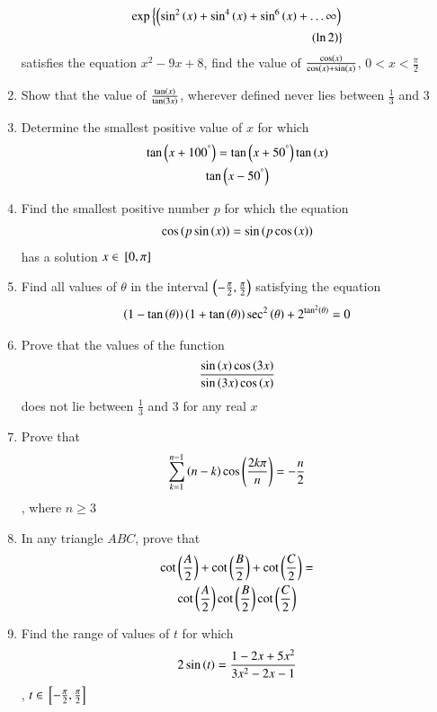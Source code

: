 \documentclass[journal,12pt,article,twocolumn]{IEEEtran}
\theoremstyle{remark}
\begin{document}
\begin{enumerate}
\begin{align*}
	\exp \left\{\left(\sin^2\left(x\right)+\sin^4\left(x\right)+\sin^6\left(x\right)+\dots\infty\right)\right.\\
	\left. \left(\ln 2\right)\right\}
\end{align*}
satisfies the equation $x^2-9x+8$, find the value of $\frac{\cos \left(x\right)}{\cos \left(x\right) + \sin \left(x\right)}$, $0<x<\frac{\pi}{2}$
\hfill{}
\item Show that the value of  $\frac{\tan \left(x\right)}{\tan \left(3x\right)}$, wherever defined never lies between $\frac{1}{3}$ and 3
\hfill{}
\item Determine the smallest positive value of $x$  for which 
\begin{multline*}
\tan {\ensuremath{\left(x+100^{\degree}\right)}}=\tan {\ensuremath{\left(x+50^{\degree}\right)}}\tan \left(x\right)\\\tan {\ensuremath{\left(x-50^{\degree}\right)}}
\end{multline*}
\hfill{}
\item Find the smallest positive number $p$ for which the equation 
\begin{align*}
\cos {\ensuremath{\left(p\sin \left(x\right)\right)}}=\sin {\ensuremath{\left(p\cos \left(x\right)\right)}}
\end{align*}
has a solution $ x \in {}\left[0, \pi\right]$
\hfill{}
\item Find all values of $\theta$ in the interval $\left(-\frac{\pi}{2},\frac{\pi}{2}\right)$ satisfying the equation 
\begin{align*}
\left(1-\tan \left(\theta\right)\right)\left(1+\tan \left(\theta\right)\right)\sec^2\left(\theta\right)+ 2^{\tan^2\left(\theta\right)}=0
\end{align*}
\hfill{}
\item Prove that the values of the function 
\begin{align*}
\frac{\sin \left(x\right) \cos \left(3x\right)}{\sin \left(3x\right) \cos \left(x\right)}
\end{align*}
does not lie between $\frac{1}{3}$ and $3$ for any real $x$\\
\hfill{}
\item Prove that 
\begin{align*}
\sum_{k=1}^{n-1} \left(n-k\right)\cos\left( \frac{2k\pi}{n}\right)=-\frac{n}{2}
\end{align*}
, where $n\ge3$
\hfill{}
\item In any triangle $ABC$, prove that 
\begin{multline*}
\cot \left(\frac{A}{2}\right)+\cot \left(\frac{B}{2}\right)+\cot \left(\frac{C}{2}\right)=\\\cot \left(\frac{A}{2}\right)\cot \left(\frac{B}{2}\right)\cot \left(\frac{C}{2}\right)
\end{multline*}
\hfill{}
\item Find the range of values of $t$ for which 
\begin{align*}
2\sin \left(t\right) = \frac{1-2x+5x^2}{3x^2-2x-1}
\end{align*}
, $t \in {}\left[-\frac{\pi}{2},\frac{\pi}{2}\right]$
\hfill{}
\end{enumerate}
\end{document}
